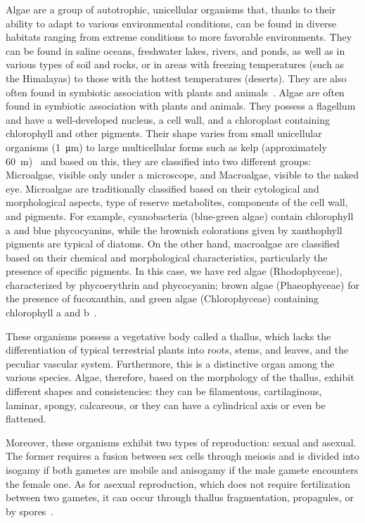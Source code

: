Algae are a group of autotrophic, unicellular organisms that, thanks to their ability to adapt to various environmental conditions, can be found in diverse habitats ranging from extreme conditions to more favorable environments. They can be found in saline oceans, freshwater lakes, rivers, and ponds, as well as in various types of soil and rocks, or in areas with freezing temperatures (such as the Himalayas) to those with the hottest temperatures (deserts). They are also often found in symbiotic association with plants and animals~\parencite{rindi_Diversity_2007}. Algae are often found in symbiotic association with plants and animals. They possess a flagellum and have a well-developed nucleus, a cell wall, and a chloroplast containing chlorophyll and other pigments. Their shape varies from small unicellular organisms (\qty{1}{\micro\metre}) to large multicellular forms such as kelp (approximately \qty{60}{\metre})~\parencite{sahoo_Algae_2015} and based on this, they are classified into two different groups: Microalgae, visible only under a microscope, and Macroalgae, visible to the naked eye. Microalgae are traditionally classified based on their cytological and morphological aspects, type of reserve metabolites, components of the cell wall, and pigments. For example, cyanobacteria (blue-green algae) contain chlorophyll a and blue phycocyanins, while the brownish colorations given by xanthophyll pigments are typical of diatoms. On the other hand, macroalgae are classified based on their chemical and morphological characteristics, particularly the presence of specific pigments. In this case, we have red algae (Rhodophyceae), characterized by phycoerythrin and phycocyanin; brown algae (Phaeophyceae) for the presence of fucoxanthin, and green algae (Chlorophyceae) containing chlorophyll a and b~\parencite{scieszka_Algae_2019}.

These organisms possess a vegetative body called a thallus, which lacks the differentiation of typical terrestrial plants into roots, stems, and leaves, and the peculiar vascular system. Furthermore, this is a distinctive organ among the various species. Algae, therefore, based on the morphology of the thallus, exhibit different shapes and consistencies: they can be filamentous, cartilaginous, laminar, spongy, calcareous, or they can have a cylindrical axis or even be flattened.

Moreover, these organisms exhibit two types of reproduction: sexual and asexual. The former requires a fusion between sex cells through meiosis and is divided into isogamy if both gametes are mobile and anisogamy if the male gamete encounters the female one. As for asexual reproduction, which does not require fertilization between two gametes, it can occur through thallus fragmentation, propagules, or by spores~\parencite{pereira_Macroalgae_2021}.


